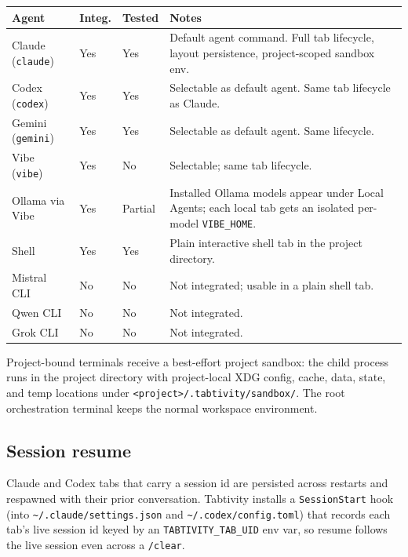 \documentclass[11pt,a4paper]{article}
\newcommand{\code}[1]{\texttt{#1}}
\begin{document}
\begin{longtable}{@{}p{4.6cm}p{1.6cm}p{1.4cm}p{6.2cm}@{}}
\toprule
\textbf{Agent} & \textbf{Integ.} & \textbf{Tested} & \textbf{Notes} \\
\midrule
\endhead
Claude (\code{claude})       & Yes & Yes     & Default agent command. Full tab lifecycle, layout persistence, project-scoped sandbox env. \\
Codex (\code{codex})         & Yes & Yes     & Selectable as default agent. Same tab lifecycle as Claude. \\
Gemini (\code{gemini})       & Yes & Yes     & Selectable as default agent. Same lifecycle. \\
Vibe (\code{vibe})           & Yes & No      & Selectable; same tab lifecycle. \\
Ollama via Vibe              & Yes & Partial & Installed Ollama models appear under Local Agents; each local tab gets an isolated per-model \code{VIBE\_HOME}. \\
Shell                        & Yes & Yes     & Plain interactive shell tab in the project directory. \\
Mistral CLI                  & No  & No      & Not integrated; usable in a plain shell tab. \\
Qwen CLI                     & No  & No      & Not integrated. \\
Grok CLI                     & No  & No      & Not integrated. \\
\bottomrule
\end{longtable}

Project-bound terminals receive a best-effort project sandbox: the child process
runs in the project directory with project-local XDG config, cache, data, state,
and temp locations under \code{<project>/.tabtivity/sandbox/}. The root
orchestration terminal keeps the normal workspace environment.

\subsection{Session resume}

Claude and Codex tabs that carry a session id are persisted across restarts and
respawned with their prior conversation. Tabtivity installs a \code{SessionStart}
hook (into \code{\textasciitilde/.claude/settings.json} and
\code{\textasciitilde/.codex/config.toml}) that records each tab's live session
id keyed by an \code{TABTIVITY\_TAB\_UID} env var, so resume follows the live
session even across a \code{/clear}.
\end{document}
